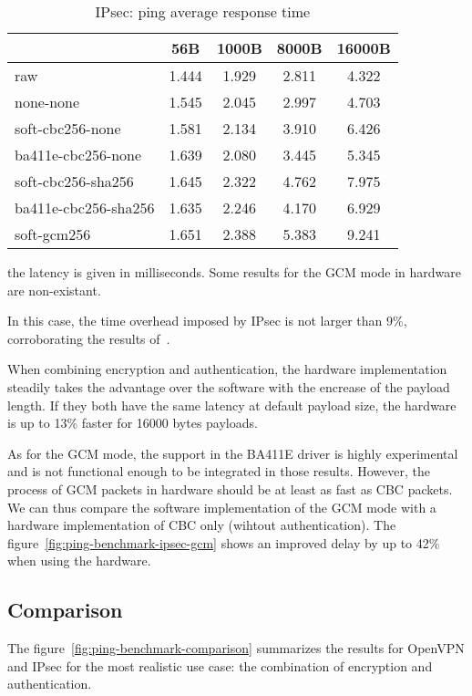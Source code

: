 \begin{table}[ht]
\center
\small
\begin{tabular}{l|c|c|c|c|} \cline{2-5}
 & 56B & 1000B & 8000B & 16000B \\ \hline
\multicolumn{1}{|l|}{raw} & 1.444 & 1.929 & 2.811 & 4.322 \\ \hline
\multicolumn{1}{|l|}{none-none} & 1.545 & 2.045 & 2.997 & 4.703 \\ \hline
\multicolumn{1}{|l|}{soft-cbc256-none} & 1.581 & 2.134 & 3.910 & 6.426 \\ \hline
\multicolumn{1}{|l|}{ba411e-cbc256-none} & 1.639 & 2.080 & 3.445 & 5.345 \\ \hline
\multicolumn{1}{|l|}{soft-cbc256-sha256} & 1.645 & 2.322 & 4.762 & 7.975 \\ \hline
\multicolumn{1}{|l|}{ba411e-cbc256-sha256} & 1.635 & 2.246 & 4.170 & 6.929 \\ \hline
\multicolumn{1}{|l|}{soft-gcm256} & 1.651 & 2.388 & 5.383 & 9.241 \\ \hline
\end{tabular}
\caption{IPsec: ping average response time}{the latency is given in milliseconds. Some results for the GCM mode in hardware are non-existant.}
\label{tab:ping-benchmark-ipsec}
\end{table}

In this case, the time overhead imposed by IPsec is not larger than 9\%, corroborating the results of~\citet{Xenakis20063225}.

When combining encryption and authentication, the hardware implementation steadily takes the advantage over the software with the encrease of the payload length.
If they both have the same latency at default payload size, the hardware is up to 13\% faster for 16000 bytes payloads.

As for the GCM mode, the support in the BA411E driver is highly experimental and is not functional enough to be integrated in those results.
However, the process of GCM packets in hardware should be at least as fast as CBC packets.
We can thus compare the software implementation of the GCM mode with a hardware implementation of CBC only (wihtout authentication).
The figure~\ref{fig:ping-benchmark-ipsec-gcm} shows an improved delay by up to 42\% when using the hardware.



\subsection{Comparison}
The figure~\ref{fig:ping-benchmark-comparison} summarizes the results for OpenVPN and IPsec for the most realistic use case: the combination of encryption and authentication.

